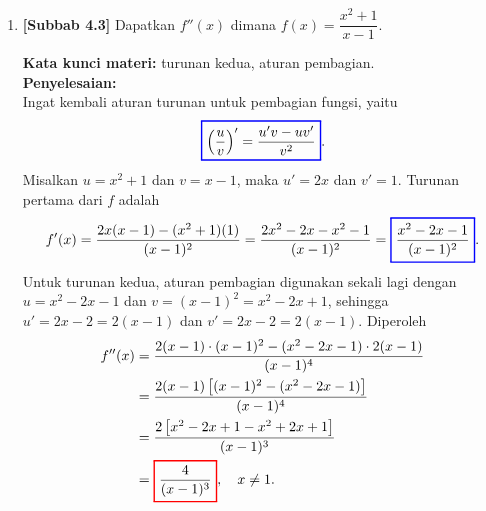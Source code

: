 \documentclass[10pt,openany,a4paper]{article}
\theoremstyle{definition}
\theoremstyle{definition}
\theoremstyle{plain}
\newenvironment{jawab}[2][tes]{%
\par\noindent\textbf{Kata kunci materi:} #1.\\
\textbf{Penyelesaian:} #2%
}{}
\begin{document}
\begin{enumerate}
    \item \textbf{[Subbab 4.3]} Dapatkan $f''(x)$ dimana $f(x)=\dfrac{x^2+1}{x-1}$.
    \begin{jawab}[turunan kedua, aturan pembagian]{~\\
        Ingat kembali aturan turunan untuk pembagian fungsi, yaitu
        \[
        \colorlet{oldcolor}{.}
        \color{blue}
        \setlength{\fboxrule}{1pt} \boxed{\color{oldcolor}\left(\frac{u}{v}\right)' = \frac{u'v - uv'}{v^2}}\color{oldcolor}.
        \]
        Misalkan $u=x^2+1$ dan $v=x-1$, maka $u'=2x$ dan $v'=1$. Turunan pertama dari $f$ adalah
        \begin{align*}
            f'(x) = \frac{2x(x-1)-(x^2+1)(1)}{(x-1)^2} = \frac{2x^2-2x-x^2-1}{(x-1)^2} = \colorlet{oldcolor}{.}
        \color{blue}
        \setlength{\fboxrule}{1pt} \boxed{\color{oldcolor}\frac{x^2-2x-1}{(x-1)^2}}\color{oldcolor}.
        \end{align*}
        Untuk turunan kedua, aturan pembagian digunakan sekali lagi dengan $u=x^2-2x-1$ dan $v=(x-1)^2=x^2-2x+1$, sehingga $u'=2x-2=2(x-1)$ dan $v'=2x-2=2(x-1)$. Diperoleh
        \begin{align*}
            f''(x) &= \frac{2(x-1)\cdot(x-1)^2-(x^2-2x-1)\cdot 2(x-1)}{(x-1)^4}\\
            &= \frac{2(x-1)\left[(x-1)^2-(x^2-2x-1)\right]}{(x-1)^4}\\
            &= \frac{2\left[x^2-2x+1-x^2+2x+1\right]}{(x-1)^3}\\
            &= \colorlet{oldcolor}{.}
        \color{red}
        \setlength{\fboxrule}{1pt} \boxed{\color{oldcolor}\frac{4}{(x-1)^3}}\color{oldcolor}, \quad x\neq 1.
        \end{align*}
    }
    \end{jawab}

\end{enumerate}

\newpage
\end{document}
